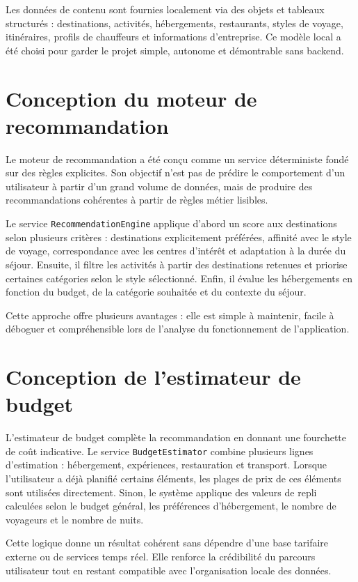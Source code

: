 \documentclass[12pt,a4paper]{report}
\begin{document}
Les données de contenu sont fournies localement via des objets et tableaux structurés : destinations, activités, hébergements, restaurants, styles de voyage, itinéraires, profils de chauffeurs et informations d'entreprise. Ce modèle local a été choisi pour garder le projet simple, autonome et démontrable sans backend.

\section{Conception du moteur de recommandation}

Le moteur de recommandation a été conçu comme un service déterministe fondé sur des règles explicites. Son objectif n'est pas de prédire le comportement d'un utilisateur à partir d'un grand volume de données, mais de produire des recommandations cohérentes à partir de règles métier lisibles.

Le service \texttt{RecommendationEngine} applique d'abord un score aux destinations selon plusieurs critères : destinations explicitement préférées, affinité avec le style de voyage, correspondance avec les centres d'intérêt et adaptation à la durée du séjour. Ensuite, il filtre les activités à partir des destinations retenues et priorise certaines catégories selon le style sélectionné. Enfin, il évalue les hébergements en fonction du budget, de la catégorie souhaitée et du contexte du séjour.

Cette approche offre plusieurs avantages : elle est simple à maintenir, facile à déboguer et compréhensible lors de l'analyse du fonctionnement de l'application.

\section{Conception de l'estimateur de budget}

L'estimateur de budget complète la recommandation en donnant une fourchette de coût indicative. Le service \texttt{BudgetEstimator} combine plusieurs lignes d'estimation : hébergement, expériences, restauration et transport. Lorsque l'utilisateur a déjà planifié certains éléments, les plages de prix de ces éléments sont utilisées directement. Sinon, le système applique des valeurs de repli calculées selon le budget général, les préférences d'hébergement, le nombre de voyageurs et le nombre de nuits.

Cette logique donne un résultat cohérent sans dépendre d'une base tarifaire externe ou de services temps réel. Elle renforce la crédibilité du parcours utilisateur tout en restant compatible avec l'organisation locale des données.
\end{document}
